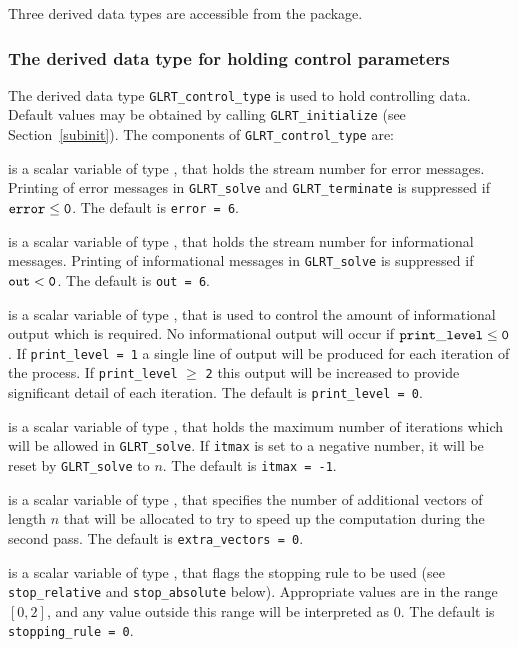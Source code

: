 \documentclass{galahad}
\newcommand{\packagename}{GL\-RT}
\begin{document}
\galtypes
Three derived data types are accessible from the package.


\subsubsection{The derived data type for holding control
 parameters}\label{typecontrol}
The derived data type
{\tt \packagename\_control\_type}
is used to hold controlling data. Default values may be obtained by calling
{\tt \packagename\_initialize}
(see Section~\ref{subinit}). The components of
{\tt \packagename\_control\_type}
are:

\begin{description}
 is a scalar variable of type \integer, that holds the
stream number for error messages.
Printing of error messages in
{\tt \packagename\_solve} and {\tt \packagename\_terminate}
is suppressed if ${\tt error} \leq {\tt 0}$.
The default is {\tt error = 6}.

 is a scalar variable of type \integer, that holds the
stream number for informational messages.
Printing of informational messages in
{\tt \packagename\_solve} is suppressed if ${\tt out} < {\tt 0}$.
The default is {\tt out = 6}.

 is a scalar variable of type \integer,
that is used
to control the amount of informational output which is required. No
informational output will occur if ${\tt print\_level} \leq {\tt 0}$. If
{\tt print\_level = 1} a single line of output will be produced for each
iteration of the process. If {\tt print\_level} $\geq$ {\tt 2} this output
will be increased to provide significant detail of each iteration.
The default is {\tt print\_level = 0}.

 is a scalar variable of type \integer, that holds the
maximum number of iterations which will be allowed in
{\tt \packagename\_solve}.
If {\tt itmax} is set to a negative number, it will be reset by
{\tt \packagename\_solve} to $n$.
The default is {\tt itmax = -1}.

 is a scalar variable of type \integer,
that specifies the number of additional vectors of length $n$
that will be allocated to try to speed up the computation during the
second pass.
The default is {\tt extra\_vectors = 0}.

 is a scalar variable of type \integer, that
flags the stopping rule to be used (see {\tt stop\_relative} and
{\tt stop\_absolute} below).
Appropriate values are in the range $[0,2]$, and any value outside this range
will be interpreted as 0.
The default is {\tt stopping\_rule = 0}.


\end{description}
\end{document}
